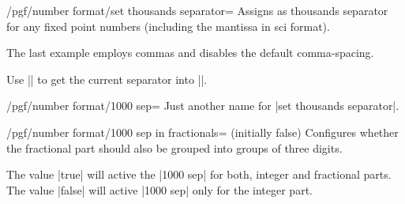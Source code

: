 \begin{key}{/pgf/number format/set thousands separator=}
  Assigns  as thousands separator for any fixed point
  numbers (including the mantissa in sci format). 

\begin{codeexample}[]
\end{codeexample}
\begin{codeexample}[]
\end{codeexample}

\begin{codeexample}[]
\end{codeexample}
\begin{codeexample}[]
\end{codeexample}
\begin{codeexample}[]
\end{codeexample}
  The last example employs commas and disables the default
  comma-spacing. 

  Use |\value| 
  to get the current separator into |\value|. 
\end{key}

\begin{stylekey}{/pgf/number format/1000 sep=}
  Just another name for |set thousands separator|.
\end{stylekey}

\begin{key}{/pgf/number format/1000 sep in fractionals= (initially false)}
  Configures whether the fractional part should also be grouped into
  groups of three digits. 

  The value |true| will active the |1000 sep| for both, integer and
  fractional parts. The value |false| will active |1000 sep| only for the integer part.
\begin{codeexample}[]
\end{codeexample}
\begin{codeexample}[]
\end{codeexample}
\end{key}

